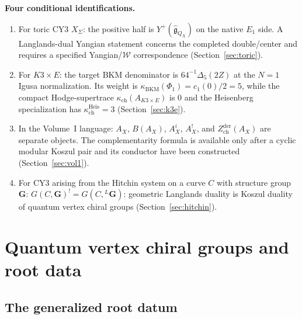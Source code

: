 \documentclass[11pt]{article}
\theoremstyle{definition}
\theoremstyle{remark}
\newcommand{\fkg}{\mathfrak{g}}
\newcommand{\cW}{\mathcal{W}}
\begin{document}
\medskip
\noindent\textbf{Four conditional identifications.}
\begin{enumerate}[label=(\arabic*)]
\item For toric CY3 $X_\Sigma$: the positive half is
$Y^+(\widehat{\fkg}_{Q_X})$ on the native $E_1$ side. A Langlands-dual
Yangian statement concerns the completed double/center and requires a
specified Yangian/$\cW$ correspondence (Section~\ref{sec:toric}).

\item For $K3 \times E$: the target BKM denominator is
$64^{-1}\Delta_5(2Z)$ at the $N=1$ Igusa normalization. Its weight is
$\kappa_{\mathrm{BKM}}(\Phi_1)=c_1(0)/2=5$, while the compact
Hodge-supertrace $\kappa_{\mathrm{ch}}(A_{K3\times E})$ is $0$ and the
Heisenberg specialization has $\kappa_{\mathrm{ch}}^{\mathrm{Heis}}=3$
(Section~\ref{sec:k3e}).

\item In the Volume~I language: $A_X$, $B(A_X)$, $A_X^i$, $A_X^!$, and
$Z^{\mathrm{der}}_{\mathrm{ch}}(A_X)$ are separate objects. The
complementarity formula is available only after a cyclic modular
Koszul pair and its conductor have been constructed
(Section~\ref{sec:vol1}).

\item For CY3 arising from the Hitchin system on a curve $C$ with
structure group $\mathbf{G}$: $G(C, \mathbf{G})^! = G(C, {}^L\mathbf{G})$:
geometric Langlands duality is Koszul duality of quantum vertex
chiral groups (Section~\ref{sec:hitchin}).
\end{enumerate}


\section{Quantum vertex chiral groups and root data}
\label{sec:recollections}

\subsection{The generalized root datum}
\end{document}
